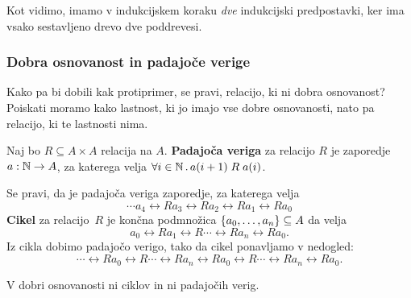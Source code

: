 Kot vidimo, imamo v indukcijskem koraku \emph{dve} indukcijski predpostavki, ker ima vsako
sestavljeno drevo dve poddrevesi.


\subsubsection{Dobra osnovanost in padajoče verige}

Kako pa bi dobili kak protiprimer, se pravi, relacijo, ki ni dobra osnovanost? Poiskati
moramo kako lastnost, ki jo imajo vse dobre osnovanosti, nato pa relacijo, ki te lastnosti nima.

\begin{definicija}
  Naj bo $R \subseteq A \times A$ relacija na $A$. \textbf{Padajoča veriga} za relacijo $R$
  je zaporedje $a : \mathbb{N} \to A$, za katerega velja $\forall i \in \mathbb{N} \,.\, a(i+1) \mathrel{R} a(i)$.
\end{definicija}

Se pravi, da je padajoča veriga zaporedje, za katerega velja
%
\begin{equation*}
  \cdots a_4 \rel{R} a_3 \rel{R} a_2 \rel{R} a_1 \rel{R} a_0
\end{equation*}
%
\textbf{Cikel} za relacijo~$R$ je končna podmnožica $\left\{a_0, \ldots, a_n\right\} \subseteq A$ da velja
%
\begin{equation*}
  a_0 \rel{R} a_1 \rel{R} \cdots \rel{R} a_n \rel{R} a_0.
\end{equation*}
%
Iz cikla dobimo padajočo verigo, tako da cikel ponavljamo v nedogled:
%
\begin{equation*}
  \cdots \rel{R} a_0 \rel{R} \cdots \rel{R} a_n
         \rel{R} a_0 \rel{R} \cdots \rel{R} a_n \rel{R} a_0.
\end{equation*}

\begin{lema}
  V dobri osnovanosti ni ciklov in ni padajočih verig.
\end{lema}

